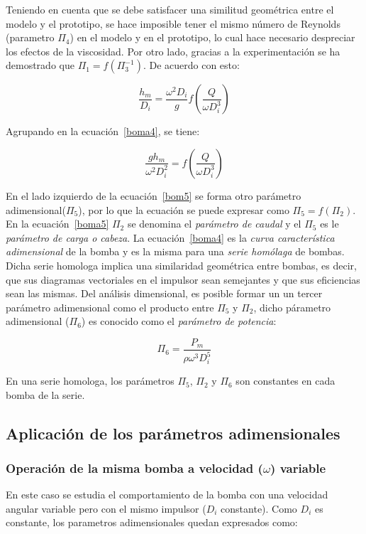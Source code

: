 \documentclass[11pt, oneside]{article}
\begin{document}
Teniendo en cuenta que se debe satisfacer una similitud geom\'etrica entre el modelo y el prototipo, se hace imposible tener el mismo n\'umero de Reynolds (parametro $\Pi_4$) en el modelo y en el prototipo, lo cual hace necesario despreciar los efectos de la viscosidad. Por otro lado, gracias a la experimentaci\'on se ha demostrado que $\Pi_1 = f(\Pi_3^{-1})$. De acuerdo con esto:

\begin{equation}
\frac{h_m}{D_i} = \frac{\omega^2 D_i}{g} f\left( \frac{Q}{\omega D_i^3}   \right)
\label{boma4}
\end{equation}

Agrupando en la ecuaci\'on~\ref{boma4}, se tiene:

\begin{equation}
\frac{g h_m}{\omega^2 D_i^2} = f\left( \frac{Q}{\omega D_i^3}   \right)
\label{boma5}
\end{equation}

En el lado izquierdo de la ecuaci\'on~\ref{bom5} se forma otro  par\'ametro adimensional($\Pi_5$), por lo que la ecuaci\'on se puede expresar como $\Pi_5 = f(\Pi_2)$. En la ecuaci\'on~\ref{boma5} $\Pi_2$ se denomina el \emph{par\'ametro de caudal} y el $\Pi_5$ es le \emph{par\'ametro de carga o cabeza}. La ecuaci\'on~\ref{boma4} es la  \emph{curva caracter\'istica adimensional} de la bomba y es la misma para una \emph{serie hom\'olaga} de bombas. Dicha serie homologa implica una similaridad geom\'etrica entre bombas, es decir, que sus  diagramas vectoriales en el impulsor sean semejantes y que sus eficiencias sean las mismas. Del an\'alisis dimensional, es posible formar un un tercer par\'ametro adimensional como el producto entre $\Pi_5$ y $\Pi_2$, dicho p\'arametro adimensional ($\Pi_6$) es conocido como el \emph{par\'ametro de potencia}:

\begin{equation}
\Pi_6 = \frac{P_m}{\rho \omega^3 D_i^5}
\label{boma6}
\end{equation}

En una serie homologa, los par\'ametros $\Pi_5$, $\Pi_2$ y $\Pi_6$ son constantes en cada bomba de la serie. 

\subsection{Aplicaci\'on de los par\'ametros adimensionales}
\subsubsection*{Operaci\'on de la misma bomba a velocidad ($\omega$) variable}
En este caso se estudia el comportamiento de la bomba con una velocidad angular variable pero con el mismo impulsor ($D_i$ constante). Como $D_i$ es constante, los parametros adimensionales quedan expresados como:
\end{document}
